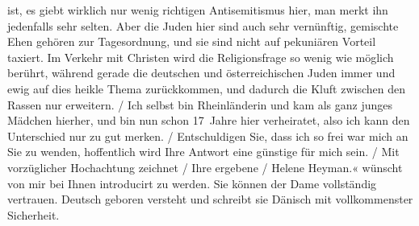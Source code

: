 {{{                        ist, es giebt wirklich nur wenig richtigen Antisemitismus hier, man merkt
                        ihn jedenfalls sehr selten. Aber die Juden hier sind auch sehr
                        ver{\pb}nünftig, gemischte Ehen gehören zur Tagesordnung, und sie sind nicht
                        auf pekuniären Vorteil taxiert. Im Verkehr mit Christen wird die
                        Religionsfrage so wenig wie möglich berührt, während gerade die deutschen und österreichischen Juden immer und ewig auf dies heikle
                        Thema zurückkommen, und dadurch die Kluft zwischen den Rassen nur
                        erweitern.{ / }Ich selbst bin Rheinländerin und kam als ganz junges Mädchen hierher, und bin nun
                        schon 17 Jahre hier verheiratet, also ich kann den Unterschied nur {\pb}zu
                        gut merken.{ / }Entschuldigen Sie, dass ich so frei war mich an Sie zu wenden, hoffentlich
                        wird Ihre Antwort eine günstige für mich sein.{ / }Mit vorzüglicher Hochachtung zeichnet{ / }Ihre ergebene{ / }Helene Heyman.«}}}\label{K_L02049-1} wünscht von mir bei Ihnen introducirt zu werden. Sie können der
               Dame vollständig vertrauen. Deutsch geboren versteht und schreibt sie Dänisch mit vollkommenster Sicherheit.\pend
           \endnumbering{}  \newcommand{\dateiname}{L02049}\newcommand{\titel}{Georg Brandes an Arthur Schnitzler, [2. 12.? 1911]}\newcommand{\editorInnen}{Martin Anton Müller und Gerd-Hermann Susen}
